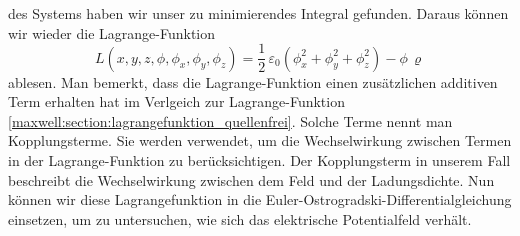 des Systems haben wir unser zu minimierendes Integral gefunden.
Daraus können wir wieder die Lagrange-Funktion
\begin{equation}
L(x,y,z,\phi,\phi_x,\phi_y,\phi_z)
=
\frac{1}{2}\,\varepsilon_0\left(\phi_x^2 + \phi_y^2 + \phi_z^2\right) - \phi\,\varrho
\label{maxwell:section:lagrangefunktion_mit_quelle}
\end{equation}
ablesen.
Man bemerkt, dass die Lagrange-Funktion einen zusätzlichen additiven Term erhalten hat im Verlgeich zur Lagrange-Funktion \eqref{maxwell:section:lagrangefunktion_quellenfrei}.
Solche Terme nennt man Kopplungsterme.
Sie werden verwendet, um die Wechselwirkung zwischen Termen in der Lagrange-Funktion zu berücksichtigen.
Der Kopplungsterm in unserem Fall beschreibt die Wechselwirkung zwischen dem Feld und der Ladungsdichte.
Nun können wir diese Lagrangefunktion in die Euler-Ostrogradski-Differentialgleichung einsetzen, um zu untersuchen, wie sich das elektrische Potentialfeld verhält.

